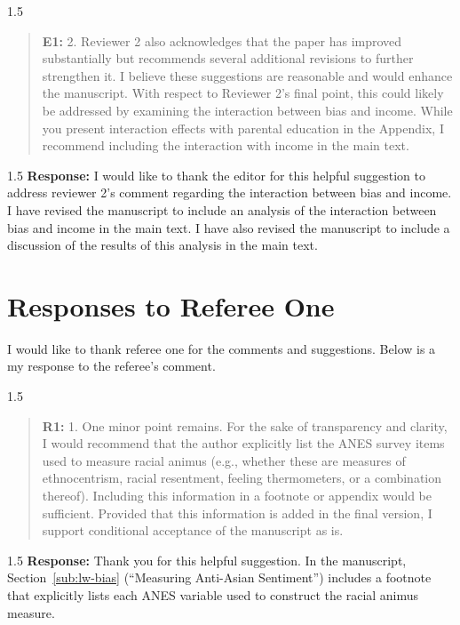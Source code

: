 \documentclass[12pt,english]{article}
\newcommand{\rrxspc}{1.5}
\begin{document}
\begin{refsection}
    \begin{spacing}{\rrxspc}
            \begin{quotation}
                \textbf{E1: } 2. Reviewer 2 also acknowledges that the paper has improved substantially but recommends several additional revisions to further strengthen it. I
                believe these suggestions are reasonable and would enhance the manuscript. With respect to Reviewer 2’s final point, this could likely be addressed by
                examining the interaction between bias and income. While you present interaction effects with parental education in the Appendix, I recommend
                including the interaction with income in the main text.
            \end{quotation}
        \end{spacing}
        \begin{spacing}{\rrxspc}
        \textbf{Response:} I would like to thank the editor for this helpful suggestion to address reviewer 2's comment regarding the interaction between bias and income. I have revised the manuscript to include an analysis of the interaction between bias and income in the main text. I have also revised the manuscript to include a discussion of the results of this analysis in the main text.
    \end{spacing}
            
    \section{Responses to Referee One}
        I would like to thank referee one for the comments and suggestions. Below is a my response to the referee's comment.
    
    \begin{spacing}{\rrxspc}
            \begin{quotation}
                \textbf{R1: } 1. One minor point remains. For the sake of transparency and clarity, I would recommend that the author explicitly list the ANES survey items used to
                measure racial animus (e.g., whether these are measures of ethnocentrism, racial resentment, feeling thermometers, or a combination thereof).
                Including this information in a footnote or appendix would be sufficient. Provided that this information is added in the final version, I support
                conditional acceptance of the manuscript as is.
            \end{quotation}
        \end{spacing}
        \begin{spacing}{\rrxspc}
            \textbf{Response:} Thank you for this helpful suggestion. In the manuscript, Section~\ref{sub:lw-bias} (``Measuring Anti-Asian Sentiment'') includes a footnote that explicitly lists each ANES variable used to construct the racial animus measure.
    \end{spacing}
    \clearpage
    \pagebreak


\end{refsection}
\end{document}
